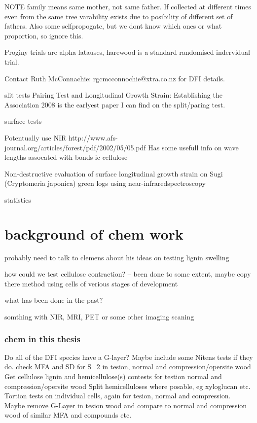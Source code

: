 \documentclass{article}
\begin{document}
NOTE family means same mother, not same father.
If collected at different times even from the same tree varability exists due
to posibility of different set of fathers. Also some selfpropogate, but we dont
know which ones or what proportion, so ignore this.

Proginy trials are alpha latauses, harewood is a standard randomised indervidual trial.

Contact Ruth McConnachie: rgcmcconnochie@xtra.co.nz for DFI details.

slit tests
Pairing Test and Longitudinal Growth Strain: Establishing the Association 2008
is the earlyest paper I can find on the split/paring test.

surface tests

Potentually use NIR
http://www.afs-journal.org/articles/forest/pdf/2002/05/05.pdf
Has some usefull info on wave lengths assocated with bonds ic cellulose

Non-destructive evaluation of surface longitudinal growth strain
on Sugi (Cryptomeria japonica) green logs using near-infraredspectroscopy

statistics

\section{background of chem work}

probably need to talk to clemens about his ideas on testing lignin swelling

how could we test cellulose contraction? -- been done to some extent, maybe copy there method using cells of verious stages of development

what has been done in the past?

somthing with NIR, MRI, PET or some other imaging scaning

\subsubsection{chem in this thesis}

Do all of the DFI species have a G-layer?
Maybe include some Nitens tests if they do.
check MFA and SD for S\_2 in tesion, normal and compression/opersite wood
Get cellulose lignin and hemicellulose(s) contests for testion normal and compression/opersite wood
    Split hemicelluloses where posable, eg xyloglucan etc.
Tortion tests on individual cells, again for tesion, normal and compression. Maybe remove G-Layer in tesion wood and compare to normal and compression wood of similar MFA and compounds etc.
\end{document}
